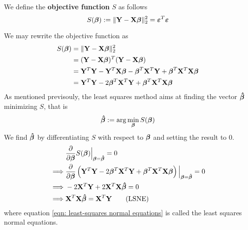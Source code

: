 \begin{definition}
    We define the \textbf{objective function} \( S \) as follows
    \begin{equation}
        \label{eqn: least squares objective function}
        S(\bta) := \| \Y-\X \bta \|_2^2 = \eps^{T} \eps
    \end{equation}
\end{definition}
We may rewrite the objective function as
\begin{align*}
    S(\boldsymbol{\beta})
     & = \| \mathbf{Y}-\mathbf{X} \boldsymbol{\beta} \|_2^2                                          \\
     & = (\mathbf{Y} - \mathbf{X} \boldsymbol{\beta})^{T} (\mathbf{Y} - \mathbf{X} \boldsymbol{\beta})                             \\
     & = \mathbf{Y}^T \mathbf{Y} - \mathbf{Y}^T \mathbf{X} \boldsymbol{\beta} - \boldsymbol{\beta}^T \mathbf{X}^T \mathbf{Y} + \boldsymbol{\beta}^T \mathbf{X}^T \mathbf{X} \boldsymbol{\beta} \\
     & = \mathbf{Y}^T \mathbf{Y} - 2 \boldsymbol{\beta}^T \mathbf{X}^T \mathbf{Y} + \boldsymbol{\beta}^T \mathbf{X}^T \mathbf{X} \boldsymbol{\beta}              \\
\end{align*}
As mentioned previsouly, the least squares method aims at finding the vector $\boldsymbol{\hat{\beta}}$ minimizing \( S \), that is
\[
    \boldsymbol{\hat{\beta}} := \arg \min_{\boldsymbol{\beta}} S(\boldsymbol{\beta})
\]
We find \( \boldsymbol{\hat{\beta}} \) by differentiating \( S \) with respect to $\boldsymbol{\beta}$ and setting the result to 0.
\begin{align}
             & \frac{\partial}{\partial \boldsymbol{\beta}} S(\boldsymbol{\beta}) \Big|_{\boldsymbol{\beta} = \boldsymbol{\hat{\beta}}} = 0 \nonumber                                                        \\
    \implies & \frac{\partial}{\partial \boldsymbol{\beta}} \left( \mathbf{Y}^T \mathbf{Y} - 2 \boldsymbol{\beta}^T \mathbf{X}^T \mathbf{Y} + \boldsymbol{\beta}^T \mathbf{X}^T \mathbf{X} \boldsymbol{\beta} \right)\Big|_{\boldsymbol{\beta} = \boldsymbol{\hat{\beta}}} = 0 \nonumber \\
    \implies & - 2 \mathbf{X}^T \mathbf{Y} + 2 \mathbf{X}^T \mathbf{X} \boldsymbol{\hat{\beta}} = 0 \nonumber                                                                                      \\
    \implies & \mathbf{X}^T \mathbf{X} \boldsymbol{\hat{\beta}} = \mathbf{X}^T \mathbf{Y} \label{eqn: least-squares normal equations} \tag{LSNE}
\end{align}
where equation \eqref{eqn: least-squares normal equations} is called the least squares normal equations.

